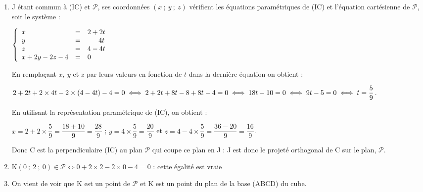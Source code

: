 \begin{enumerate}
\begin{enumerate}
$M(x~;~y~;~z) \in \mathcal{P} \iff 2x + 4y - 4z + d = 0$, avec $d \in \R$.

Ainsi G(4~;~4~;~4) $\in \mathcal{P} \iff 2 \times 4 + 4 \times 4 - 4 \times 4 + d = 0 \iff d = - 8$.

On a donc $M(x~;~y~;~z) \in \mathcal{P} \iff 2x + 4y - 4z - 8 = 0 \iff x + 2y - 2z - 4 = 0$.

		\item %
		
J étant commun à (IC) et $\mathcal{P}$, ses coordonnées $(x~;~y~;~z)$ vérifient les équations paramétriques de (IC) et l'équation cartésienne de $\mathcal{P}$, soit le système :

$\left\{\begin{array}{l c l}
x &=&2+2t\\
y &=&\phantom{2 +~}4t\\
z &=&4 - 4t\\
x + 2y - 2z - 4 &=& 0
\end{array}\right.$ 

En remplaçant $x,\:y$ et $z$ par leurs valeurs en fonction de $t$ dans la dernière équation on obtient :

$2+2t + 2\times 4t - 2\times (4 - 4t) - 4 = 0 \iff 2 + 2t + 8t - 8  + 8t - 4 = 0\\
\iff 18t - 10 = 0\iff 9t - 5 = 0 \iff t = \dfrac{5}{9}$.

En utilisant la représentation paramétrique de (IC), on obtient :

$x = 2 + 2\times \dfrac{5}{9} = \dfrac{18 + 10}{9} = \dfrac{28}{9}$ ; $y = 4 \times \dfrac59 = \dfrac{20}{9}$ et $z = 4 - 4\times \dfrac59 = \dfrac{36 - 20}{9} = \dfrac{16}{9}$.

Donc C est la perpendiculaire (IC) au plan $\mathcal{P}$ qui coupe ce plan en J : J est donc le projeté orthogonal de C sur le plan, $\mathcal{P}$.

		\item %
K$(0~;~2~;~0) \in \mathcal{P} \iff 0 + 2 \times 2 - 2\times 0 - 4 = 0$ : cette égalité est vraie

		\item %
On vient de voir que K est un point de $\mathcal{P}$ et K est un point du plan de la base (ABCD) du cube.


\end{enumerate}
\end{enumerate}
